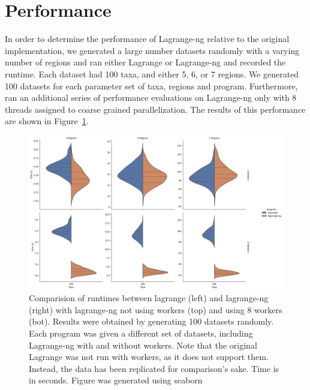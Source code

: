 \documentclass[oupdraft]{sysbio}
\begin{document}
\bigskip
\section{Performance}\label{sec:performance}

In order to determine the performance of Lagrange-ng relative to the original implementation, we generated a large
number datasets randomly with a varying number of regions and ran either Lagrange or Lagrange-ng and recorded the
runtime. Each dataset had 100 taxa, and either 5, 6, or 7 regions. We generated 100 datasets for each parameter set of
taxa, regions and program. Furthermore, ran an additional series of performance evaluations on Lagrange-ng only with 8
threads assigned to coarse grained parallelization. The results of this performance are shown in
Figure~\ref{fig:all-results}.

\begin{figure}
  \noindent
  \begin{center}
    \includegraphics[width=\linewidth]{all_results_violin.png}
  \end{center}
  \caption{Comparision of runtimes between lagrange (left) and lagrange-ng (right) with lagrange-ng not using workers
    (top) and using 8 workers (bot). Results were obtained by generating 100 datasets randomly. Each program was given a
    different set of datasets, including Lagrange-ng with and without workers. Note that the original Lagrange was not
    run with workers, as it does not support them. Instead, the data has been replicated for comparison's sake. Time is
    in seconds. Figure was generated using seaborn \citep{Waskom2021}
    \label{fig:all-results}
  }
\end{figure}

\bigskip
\end{document}
